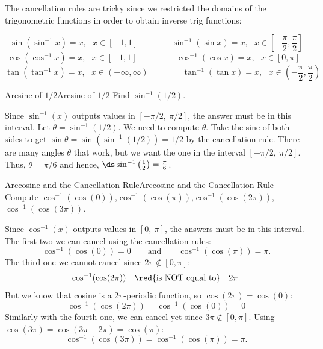The cancellation rules are tricky since we restricted the domains of the trigonometric functions in order to obtain inverse trig functions:

\begin{formulabox}
\[ \sin ( \sin^{-1} x ) = x, \ \ \ x \in [-1, 1] \qquad\qquad \sin^{-1} ( \sin x) = x, \ \ \ x \in \left[-\frac{\pi}{2}, \frac{\pi}{2} \right] \]
\[ \cos ( \cos^{-1} x ) = x, \ \ \ x \in [-1, 1] \qquad\qquad \ \ \ \cos^{-1} ( \cos x) = x, \ \ \ x \in \left[0, \pi \right]\ \ \  \]
\[ \tan ( \tan^{-1} x ) = x, \ \ \ x \in (-\infty, \infty) \qquad\qquad \tan^{-1} ( \tan x) = x, \ \ \ x \in \left(-\frac{\pi}{2}, \frac{\pi}{2} \right) \]
\end{formulabox}

\begin{example}{Arcsine of $1/2$}{Arcsine of $1/2$}
Find $\sin ^{-1}\left( 1/2\right) $. 
\end{example}

\begin{solution}
Since $\sin^{-1}(x)$ outputs values in $[-\pi/2,~\pi/2]$, the answer must be in this interval.
Let $\theta=\sin^{-1}(1/2)$. 
We need to compute $\theta$. 
Take the sine of both sides to get $\sin \theta = \sin(\sin^{-1}(1/2))=1/2$ by the cancellation rule.
There are many angles $\theta$ that work, but we want the one in the interval $[-\pi/2,~\pi/2]$.
Thus, $\theta=\pi/6$ and hence, $\ds\sin^{-1}\left(\frac{1}{2}\right)=\frac{\pi}{6}$.
\end{solution}

\begin{example}{Arccosine and the Cancellation Rule}{Arccosine and the Cancellation Rule}
Compute $\cos ^{-1}(\cos(0))$,\quad $\cos ^{-1}(\cos(\pi))$,\quad $\cos^{-1}(\cos(2\pi))$,\quad $\cos^{-1}(\cos(3\pi))$. 
\end{example}

\begin{solution}
Since $\cos^{-1}(x)$ outputs values in $[0,~\pi]$, the answers must be in this interval.  
The first two we can cancel using the cancellation rules:  
$$\cos ^{-1}(\cos(0))=0\qquad\mbox{and}\qquad\cos ^{-1}(\cos(\pi))=\pi.$$ 
The third one we cannot cancel since $2\pi\notin[0,\pi]$:
$$\cos ^{-1}(\cos(2\pi))\mbox{\quad\red{is NOT equal to}\quad}2\pi.$$  
But we know that cosine is a $2\pi$-periodic function, so $\cos(2\pi)=\cos(0)$: 
$$\cos ^{-1}(\cos(2\pi))=\cos^{-1}(\cos(0))=0$$
Similarly with the fourth one, we can  cancel yet since $3\pi\notin[0,\pi]$. Using $\cos(3\pi)=\cos(3\pi-2\pi)=\cos(\pi)$:  
$$\cos ^{-1}(\cos(3\pi))=\cos^{-1}(\cos(\pi))=\pi.$$
\end{solution}

